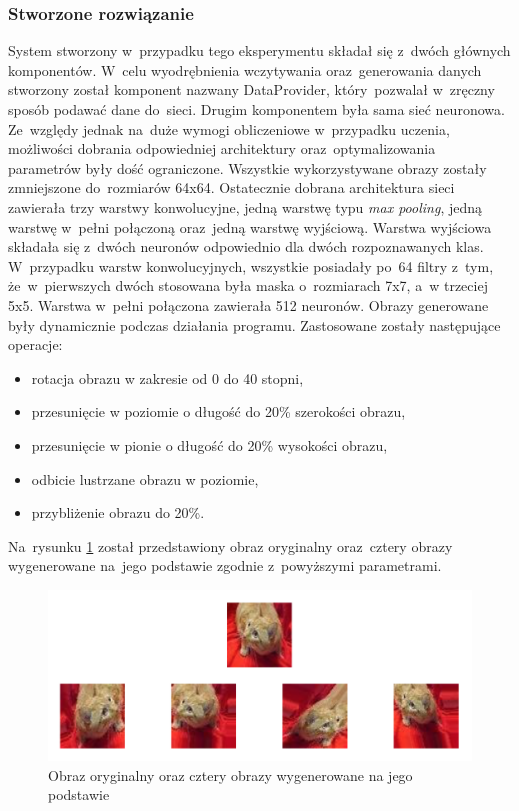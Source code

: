 \subsubsection{Stworzone rozwiązanie}
System stworzony w~przypadku tego eksperymentu składał się z~dwóch głównych komponentów. W~celu wyodrębnienia wczytywania oraz~generowania danych stworzony został komponent nazwany DataProvider, który~pozwalał w~zręczny sposób podawać dane do~sieci. Drugim komponentem była sama sieć neuronowa. Ze~względy jednak na~duże wymogi obliczeniowe w~przypadku uczenia, możliwości dobrania odpowiedniej architektury oraz~optymalizowania parametrów były dość ograniczone. Wszystkie wykorzystywane obrazy zostały zmniejszone do~rozmiarów 64x64. Ostatecznie dobrana architektura sieci zawierała trzy warstwy konwolucyjne, jedną warstwę typu \textit{max pooling}, jedną warstwę w~pełni połączoną  oraz~jedną warstwę wyjściową. Warstwa wyjściowa składała się z~dwóch neuronów odpowiednio dla dwóch rozpoznawanych klas. W~przypadku warstw konwolucyjnych, wszystkie posiadały po~64 filtry z~tym, że~w~pierwszych dwóch stosowana była maska o~rozmiarach 7x7, a~w trzeciej 5x5.  Warstwa w~pełni połączona zawierała 512 neuronów. Obrazy generowane były dynamicznie podczas działania programu. Zastosowane zostały następujące operacje:
\begin{itemize}
\item rotacja obrazu w zakresie od 0 do 40 stopni,
\item przesunięcie w poziomie o długość do 20\% szerokości obrazu,
\item przesunięcie w pionie o długość do 20\% wysokości obrazu,
\item odbicie lustrzane obrazu w poziomie,
\item przybliżenie obrazu do 20\%.
\end{itemize}
Na~rysunku \ref{catdogsimages} został przedstawiony obraz oryginalny oraz~cztery obrazy wygenerowane na~jego podstawie zgodnie z~powyższymi parametrami.

\begin{figure}[ht!]
\centering
\includegraphics[scale=0.4]{res/catdogsaug.png}
\caption[Caption for LOF]{Obraz oryginalny oraz cztery obrazy wygenerowane na jego podstawie \label{catdogsimages}}
\end{figure} 

